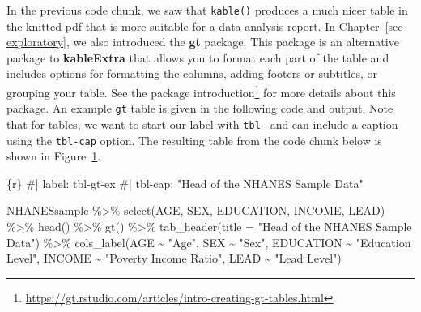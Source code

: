 \documentclass[
  letterpaper,
]{latex/krantz}
\makeatletter
\newenvironment{Shaded}{\begin{snugshade}}{\end{snugshade}}
\newcommand{\InformationTok}[1]{\textcolor[rgb]{0.37,0.37,0.37}{#1}}
\renewcommand{\href}[2]{#2\footnote{\url{#1}}}
\newenvironment{kframe}{%
\medskip{}
\setlength{\fboxsep}{.8em}
 \def\at@end@of@kframe{}%
 \ifinner\ifhmode%
  \def\at@end@of@kframe{\end{minipage}}%
  \begin{minipage}{\columnwidth}%
 \fi\fi%
 \def\FrameCommand##1{\hskip\@totalleftmargin \hskip-\fboxsep
 \colorbox{shadecolor}{##1}\hskip-\fboxsep
     \hskip-\linewidth \hskip-\@totalleftmargin \hskip\columnwidth}%
 \MakeFramed {\advance\hsize-\width
   \@totalleftmargin\z@ \linewidth\hsize
   \@setminipage}}%
 {\par\unskip\endMakeFramed%
 \at@end@of@kframe}
\renewenvironment{Shaded}{\begin{kframe}}{\end{kframe}}
\makeatother
\begin{document}
In the previous code chunk, we saw that \texttt{kable()} produces a much
nicer table in the knitted pdf that is more suitable for a data analysis
report. In Chapter~\ref{sec-exploratory}, we also introduced the
\textbf{gt} package. This package is an alternative
package to \textbf{kableExtra} that allows you to format each part of
the table and includes options for formatting the columns, adding
footers or subtitles, or grouping your table. See the
\href{https://gt.rstudio.com/articles/intro-creating-gt-tables.html}{package
introduction} for more details about this package. An example
\texttt{gt} table is given in the following code and output. Note that
for tables, we want to start our label with \texttt{tbl-} and can
include a caption using the \texttt{tbl-cap} option. The resulting table
from the code chunk below is shown in Figure~\ref{fig-gt-ex}.

\begin{Shaded}
\begin{Highlighting}[]
  \InformationTok{\textasciigrave{}\textasciigrave{}\textasciigrave{}\{r\}}
\InformationTok{  \#| label: tbl{-}gt{-}ex}
\InformationTok{  \#| tbl{-}cap: "Head of the NHANES Sample Data"}

\InformationTok{  NHANESsample \%\textgreater{}\% }
\InformationTok{  select(AGE, SEX, EDUCATION, INCOME, LEAD) \%\textgreater{}\% }
\InformationTok{  head() \%\textgreater{}\% }
\InformationTok{  gt() \%\textgreater{}\%}
\InformationTok{  tab\_header(title = "Head of the NHANES Sample Data") \%\textgreater{}\%}
\InformationTok{  cols\_label(AGE \textasciitilde{} "Age", }
\InformationTok{      SEX \textasciitilde{} "Sex", }
\InformationTok{      EDUCATION \textasciitilde{} "Education Level", }
\InformationTok{      INCOME \textasciitilde{} "Poverty Income Ratio",}
\InformationTok{      LEAD \textasciitilde{} "Lead Level")}
\InformationTok{  \textasciigrave{}\textasciigrave{}\textasciigrave{}}
\end{Highlighting}
\end{Shaded}

\begin{figure}


\caption{\label{fig-gt-ex}}

\end{figure}%
\end{document}
